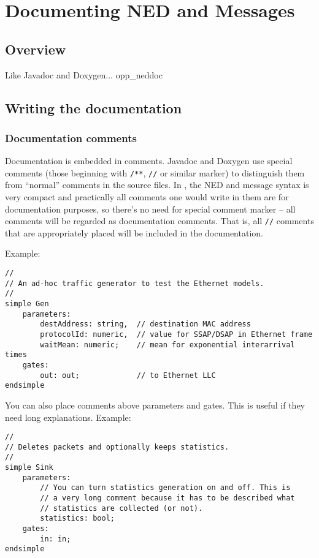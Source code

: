 \chapter{Documenting NED and Messages}
\label{cha:neddoc}

\section{Overview}

Like Javadoc and Doxygen... opp\_neddoc


\section{Writing the documentation}


\subsection{Documentation comments}

Documentation is embedded in comments. Javadoc and Doxygen use special
comments (those beginning with \texttt{/**}, \texttt{//} or similar marker)
to distinguish them from ``normal'' comments in the source files.
In {\opp}, the NED and message syntax is very compact and practically all
comments one would write in them are for documentation purposes,
so there's no need for special comment marker -- all comments will be
regarded as documentation comments. That is, all \texttt{//} comments
that are appropriately placed will be included in the documentation.

Example:

\begin{verbatim}
//
// An ad-hoc traffic generator to test the Ethernet models.
//
simple Gen
    parameters:
        destAddress: string,  // destination MAC address
        protocolId: numeric,  // value for SSAP/DSAP in Ethernet frame
        waitMean: numeric;    // mean for exponential interarrival times
    gates:
        out: out;             // to Ethernet LLC
endsimple
\end{verbatim}

You can also place comments above parameters and gates. This is useful
if they need long explanations. Example:

\begin{verbatim}
//
// Deletes packets and optionally keeps statistics.
//
simple Sink
    parameters:
        // You can turn statistics generation on and off. This is
        // a very long comment because it has to be described what
        // statistics are collected (or not).
        statistics: bool;
    gates:
        in: in;
endsimple
\end{verbatim}

